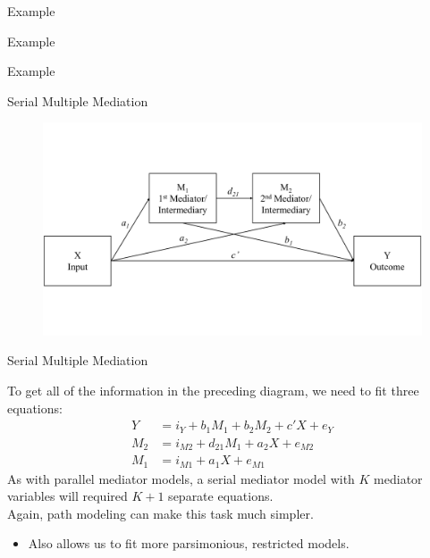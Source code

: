 \documentclass{beamer}
\newcommand{\va}[0]{\vspace{12pt}}
\newcommand{\vb}[0]{\vspace{6pt}}
\begin{document}
\begin{frame}[allowframebreaks]{Example}



\end{frame}



\begin{frame}[allowframebreaks]{Example}
 


\end{frame}


\begin{frame}[shrink = 5]{Example}
  


\end{frame}



\begin{frame}{Serial Multiple Mediation}

  \begin{figure}
    \includegraphics[width=\textwidth]{figures/serialDiagram.pdf}
  \end{figure}

\end{frame}


\begin{frame}{Serial Multiple Mediation}
  
  To get all of the information in the preceding diagram, we need to
  fit three equations:
  \begin{align*}
    Y &= i_Y + b_1 M_1 + b_2 M_2 + c' X + e_Y\\
    M_2 &= i_{M2} + d_{21} M_1 + a_2 X + e_{M2}\\
    M_1 &= i_{M1} + a_1 X + e_{M1}
  \end{align*}
  As with parallel mediator models, a serial mediator model with $K$
  mediator variables will required $K + 1$ separate equations.\\ 
  \va
  Again, path modeling can make this task much simpler.
  \vb
  \begin{itemize}
  \item Also allows us to fit more parsimonious, restricted models.
  \end{itemize}
  
\end{frame}
\end{document}
